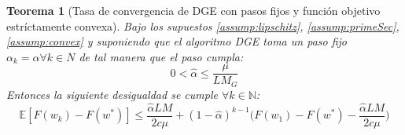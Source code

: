 \documentclass{book}
\theoremstyle{plain}
\newtheorem{thm}{Teorema}[section]
\theoremstyle{definition}
\theoremstyle{remark}
\begin{document}
\begin{thm}[Tasa de convergencia de DGE con pasos fijos y función objetivo estríctamente convexa]
Bajo los supuestos \ref{assump:lipschitz}, \ref{assump:primeSec}, \ref{assump:convex} y suponiendo que el algoritmo DGE toma un paso fijo $\alpha_k = \hat{\alpha}\forall k \in N$ de tal manera que el paso cumpla:
\begin{equation}\label{eq:paso}
        0 < \hat{\alpha}\leq\frac{\mu}{L M_G}
\end{equation}
Entonces la siguiente desigualdad se cumple $\forall k \in \mathbb{N}$:
\begin{equation}\label{eq:convergence}
    \mathbb{E}[F(w_k)- F(w^*)] \leq \frac{\hat{\alpha}LM}{2c\mu} + (1-\hat{\alpha})^{k-1}\Big(F(w_1)-F(w^*)-\frac{\hat{\alpha} LM}{2c\mu}\Big)
\end{equation}
\end{thm}
\end{document}
